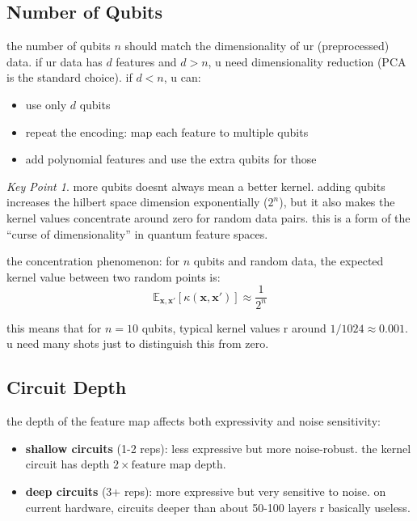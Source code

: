 \documentclass[11pt,a4paper]{article}
\theoremstyle{definition}
\theoremstyle{remark}
\newtheorem*{keypoint}{Key Point}
\begin{document}
\subsection{Number of Qubits}

the number of qubits $n$ should match the dimensionality of ur (preprocessed) data. if ur data has $d$ features and $d > n$, u need dimensionality reduction (PCA is the standard choice). if $d < n$, u can:
\begin{itemize}[leftmargin=*]
    \item use only $d$ qubits
    \item repeat the encoding: map each feature to multiple qubits
    \item add polynomial features and use the extra qubits for those
\end{itemize}

\begin{keypoint}
more qubits doesnt always mean a better kernel. adding qubits increases the hilbert space dimension exponentially ($2^n$), but it also makes the kernel values concentrate around zero for random data pairs. this is a form of the ``curse of dimensionality'' in quantum feature spaces.
\end{keypoint}

the concentration phenomenon: for $n$ qubits and random data, the expected kernel value between two random points is:
\[
\mathbb{E}_{\mathbf{x}, \mathbf{x}'}[\kappa(\mathbf{x}, \mathbf{x}')] \approx \frac{1}{2^n}
\]

this means that for $n = 10$ qubits, typical kernel values r around $1/1024 \approx 0.001$. u need many shots just to distinguish this from zero.

\subsection{Circuit Depth}

the depth of the feature map affects both expressivity and noise sensitivity:

\begin{itemize}[leftmargin=*]
    \item \textbf{shallow circuits} (1-2 reps): less expressive but more noise-robust. the kernel circuit has depth $2 \times \text{feature map depth}$.
    \item \textbf{deep circuits} (3+ reps): more expressive but very sensitive to noise. on current hardware, circuits deeper than about 50-100 layers r basically useless.
\end{itemize}
\end{document}
